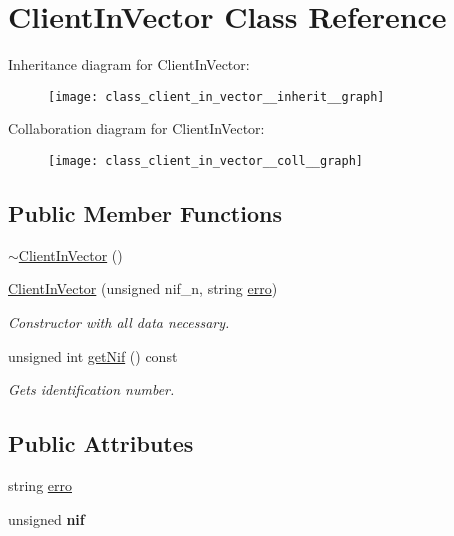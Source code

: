 \hypertarget{class_client_in_vector}{}\section{Client\+In\+Vector Class Reference}
\label{class_client_in_vector}


Inheritance diagram for Client\+In\+Vector\+:
\nopagebreak
\begin{figure}[H]
\begin{center}
\leavevmode
\texttt{[image: class\_client\_in\_vector\_\_inherit\_\_graph]}
\end{center}
\end{figure}


Collaboration diagram for Client\+In\+Vector\+:
\nopagebreak
\begin{figure}[H]
\begin{center}
\leavevmode
\texttt{[image: class\_client\_in\_vector\_\_coll\_\_graph]}
\end{center}
\end{figure}
\subsection*{Public Member Functions}
\begin{DoxyCompactItemize}
\item 
\hyperlink{class_client_in_vector_aa5187e63a59d3340d1287d7a91b4106a}{$\sim$\+Client\+In\+Vector} ()
\item 
\hyperlink{class_client_in_vector_a10ec0356f39e99be9205d5c0f6897652}{Client\+In\+Vector} (unsigned nif\+\_\+n, string \hyperlink{class_client_in_vector_a65d04995fa02a6f36d00540120be34b5}{erro})
\begin{DoxyCompactList}\small\item\em Constructor with all data necessary. \end{DoxyCompactList}\item 
unsigned int \hyperlink{class_client_in_vector_adab501aba615f5d9b69bbe7a28053801}{get\+Nif} () const
\begin{DoxyCompactList}\small\item\em Gets identification number. \end{DoxyCompactList}\end{DoxyCompactItemize}
\subsection*{Public Attributes}
\begin{DoxyCompactItemize}
\item 
string \hyperlink{class_client_in_vector_a65d04995fa02a6f36d00540120be34b5}{erro}
\item 
\mbox{\label{class_client_in_vector_a8a7af8db098724eb214125a67c733955}} 
unsigned {\bfseries nif}
\end{DoxyCompactItemize}
